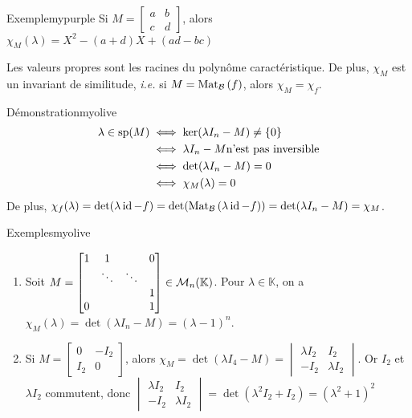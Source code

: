     \begin{omed}{Exemple}{mypurple}
        Si $M = \begin{bmatrix}
            a & b \\
            c & d
        \end{bmatrix}$, alors $\chi_M(\lambda) = X^2 - (a+d)X + (ad - bc)$
    \end{omed}

    \begin{prop}{}{}
        Les valeurs propres sont les racines du polynôme caractéristique. De plus, $\chi_M$ est un invariant de similitude, \textit{i.e.} si $M = \mat{\mathcal{B}}{f}$, alors $\chi_M = \chi_f$.
    \end{prop}

    \begin{demo}{Démonstration}{myolive}
        \begin{align*}
            \lambda \in \sp(M) 
            &\iff \ker(\lambda I_n - M) \neq \left\{0\right\} \\
            &\iff \lambda I_n - M \text{n’est pas inversible} \\
            &\iff \det(\lambda I_n - M) = 0 \\
            &\iff \chi_M(\lambda) = 0
        \end{align*}
        De plus, $\chi_f(\lambda) = \det(\lambda \id -f) = \det(\mat{\mathcal{B}}{\lambda \id - f}) = \det(\lambda I_n - M) = \chi_M$.
    \end{demo}

    \begin{omed}{Exemples}{myolive}
        \begin{enumerate}[label=\arabic*]
            \item  Soit $M = \begin{bmatrix}
                1 & 1 & & 0 \\
                 & \ddots & \ddots & \\
                 & & & 1 \\
                0 & & & 1
            \end{bmatrix} \in \mk{n}$. Pour $\lambda \in \mathbb{K}$, on a $\chi_M(\lambda) = \det(\lambda I_n - M) = (\lambda - 1)^n$.
            \item Si $M = \begin{bmatrix}
                0 & -I_2 \\
                I_2 & 0
            \end{bmatrix}$, alors $\chi_M = \det(\lambda I_4 - M) = \begin{vmatrix}
                \lambda I_2 & I_2 \\
                - I_2 & \lambda I_2
            \end{vmatrix}$. Or $I_2$ et $\lambda I_2$ commutent, donc $\begin{vmatrix}
                \lambda I_2 & I_2 \\
                - I_2 & \lambda I_2
            \end{vmatrix} = \det(\lambda^2 I_2 + I_2) = \left(\lambda^2 + 1\right)^2$
        \end{enumerate}
    \end{omed}

